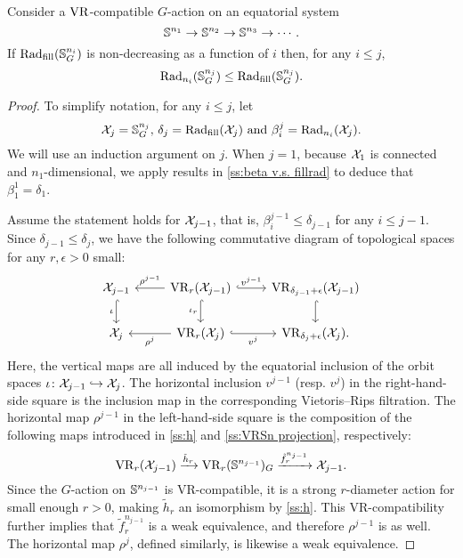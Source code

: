 \subsubsection{}\label{ss:fundamental_lemma}

\medskip\lemma Consider a $\mathrm{VR}$-compatible \(G\)-action on an equatorial system
\[
\mathbb{S}^{n_1} \to \mathbb{S}^{n_2} \to \mathbb{S}^{n_3} \to \dotsb .
\]
If $\mathrm{Rad}_{\mathrm{fill}}(\mathbb{S}^{n_i}_G)$ is non-decreasing as a function of \(i\) then, for any \(i \leq j\),
\[
\mathrm{Rad}_{n_i}(\mathbb{S}^{n_j}_G) \leq \mathrm{Rad}_{\mathrm{fill}}(\mathbb{S}^{n_j}_G).
\]

\begin{proof}
    To simplify notation, for any $i \leq j$, let
    \[
        \mathcal{X}_j = \mathbb{S}^{n_j}_G, \,\delta_j = \mathrm{Rad}_{\mathrm{fill}}(\mathcal{X}_j) \text{ and }\beta_i^j = \mathrm{Rad}_{n_i}(\mathcal{X}_j).
    \]
	We will use an induction argument on $j$.
	When $j = 1$, because $\mathcal{X}_1$ is connected and $n_1$-dimensional, we apply results in \cref{ss:beta v.s. fillrad} to deduce that $\beta_1^1 = \delta_1$.

	Assume the statement holds for $\mathcal{X}_{j-1}$, that is, $\beta_i^{j-1} \leq \delta_{j-1}$ for any $i \leq j-1$.
	Since $\delta_{j-1} \leq \delta_j$, we have the following commutative diagram of topological spaces for any $r,\epsilon>0$ small:
    \begin{equation}\label{d:fundamental_bars_diagram}
        \begin{tikzcd}
            \cX_{j-1}
            \ar[d, hook,"{\iota}" left]
            &
            \VR_r(\cX_{j-1})
            \ar[d, hook,"\iota_r" left]
            \ar[l, "\rho^{j-1}" above]
            \ar[r, hook, "v^{j-1}"]
            &
            \VR_{\delta_{j-1}+\epsilon}(\cX_{j-1})
            \ar[d, hook]
            \\
            \cX_j
            &
            \VR_r(\cX_j)
            \ar[l, "\rho^j" below]
            \ar[r, hook, "v^j" below]
            &
            \VR_{\delta_j+\epsilon}(\cX_j).
        \end{tikzcd}
    \end{equation}
    Here, the vertical maps are all induced by the equatorial inclusion of the orbit spaces $\iota \colon \mathcal{X}_{j-1} \hookrightarrow \mathcal{X}_j$.
    The horizontal inclusion $v^{j-1}$ (resp. $v^j$) in the right-hand-side square is the inclusion map in the corresponding Vietoris--Rips filtration.
    The horizontal map $\rho^{j-1}$ in the left-hand-side square is the composition of the following maps introduced in \cref{ss:h} and \cref{ss:VRSn projection}, respectively:
    \[\mathrm{VR}_r(\mathcal{X}_{j-1}) \xrightarrow{\tilde{h}_r}\mathrm{VR}_r(\mathbb{S}^{n_{j-1}})_G \xrightarrow{\tilde{f}_r^{n_{j-1}}} \mathcal{X}_{j-1}.\]
    Since the \( G \)-action on \( \mathbb{S}^{n_{j-1}} \) is VR-compatible, it is a strong \( r \)-diameter action for small enough $r>0$, making \( \tilde{h}_r \) an isomorphism by \cref{ss:h}.
    This VR-compatibility further implies that \( \tilde{f}_r^{n_{j-1}} \) is a weak equivalence, and therefore \( \rho^{j-1} \) is as well.
    The horizontal map \( \rho^j \), defined similarly, is likewise a weak equivalence.


\end{proof}

